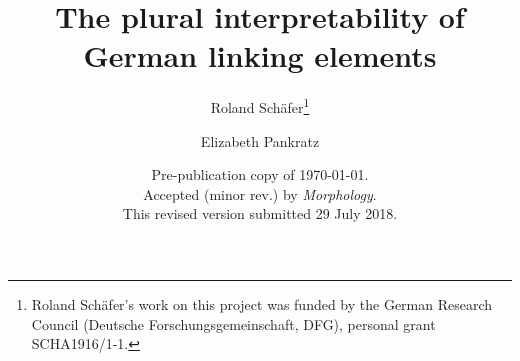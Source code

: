 \usepackage{natbib}


\usepackage[margin=4cm]{geometry}

\usepackage{authblk}
\author[1]{Roland Schäfer\thanks{Roland Schäfer's work on this project was funded by the German Research Council (Deutsche Forschungsgemeinschaft, DFG), personal grant SCHA1916/1-1.}}
\author[2]{Elizabeth Pankratz}

\title{The plural interpretability of German linking elements}
\date{Pre-publication copy of \today.\\Accepted (minor rev.) by \textit{Morphology}.\\This revised version submitted 29 July 2018.}

\newenvironment{acknowledgements}{\section*{Acknowledgements}}{}
\newenvironment{ethicalstandards}{\section*{Compliance with ethical standards}}{}
\newcommand{\keywords}[1]{\newline\vspace{\baselineskip}\newline\noindent \textbf{Keywords: #1}}

\newcommand{\TheDOI}{\url{https://doi.org/10.5281/zenodo.1323211}}
\newcommand{\TheUniversity}{Freie Universität Berlin}
